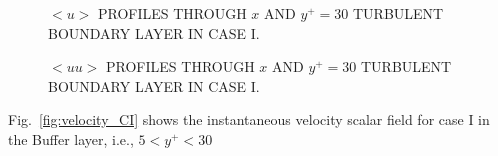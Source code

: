 \documentclass[twocolumn,10pt]{asme2e}
\begin{document}
\begin{figure}[!htbp]
\begin{center}
\setlength{\unitlength}{0.012500in}%
\end{center}
  \caption{\(<u>\) PROFILES THROUGH \(x\) AND \(y^+=30\) TURBULENT BOUNDARY LAYER IN CASE I.}
  \label{fig:u_profile_CI}
\end{figure}

\begin{figure}[!htbp]
\begin{center}
\end{center}
  \caption{\(<uu>\) PROFILES THROUGH \(x\) AND \(y^+=30\) TURBULENT BOUNDARY LAYER IN CASE I.}
  \label{fig:uu_profile_CI}
\end{figure}


Fig.~\ref{fig:velocity_CI} shows the instantaneous velocity scalar field for case I in the Buffer layer, i.e., \(5<y^+<30\)





\appendix   
\end{document}
